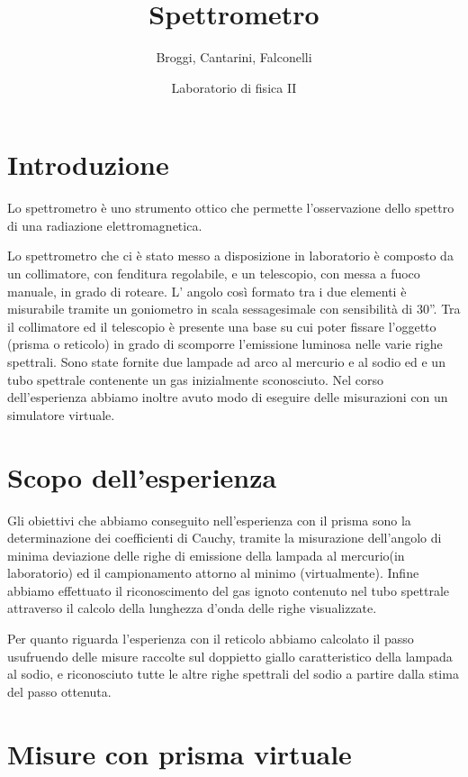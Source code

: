 \documentclass[a4paper]{article}
\title{Spettrometro}
\author{Broggi, Cantarini, Falconelli}
\date{Laboratorio di fisica II}
\theoremstyle{definition}
\begin{document}
\maketitle

\section{Introduzione}

Lo spettrometro è uno strumento ottico che permette l’osservazione dello spettro di una radiazione elettromagnetica.

Lo spettrometro che ci è stato messo a disposizione in laboratorio è composto da un collimatore, con fenditura regolabile, e un telescopio, con messa a fuoco manuale, in grado di roteare. L' angolo così formato tra i due elementi è misurabile tramite un goniometro in scala sessagesimale con sensibilità di 30”. Tra il collimatore ed il telescopio è presente una base su cui poter fissare l’oggetto (prisma o reticolo) in grado di scomporre l’emissione luminosa nelle varie righe spettrali. Sono state fornite due lampade ad arco al mercurio e al sodio ed e un tubo spettrale contenente un gas inizialmente sconosciuto.
Nel corso dell’esperienza abbiamo inoltre avuto modo di eseguire delle misurazioni con un simulatore virtuale.

\section{Scopo dell'esperienza}

Gli obiettivi che abbiamo conseguito nell’esperienza con il prisma sono la determinazione dei coefficienti di Cauchy, tramite la misurazione dell’angolo di minima deviazione delle righe di emissione della lampada al mercurio(in laboratorio) ed il campionamento attorno al minimo (virtualmente). Infine abbiamo effettuato il riconoscimento del gas ignoto contenuto nel tubo spettrale attraverso il calcolo della lunghezza d’onda delle righe visualizzate.

Per quanto riguarda l’esperienza con il reticolo abbiamo calcolato il passo usufruendo delle misure raccolte sul doppietto giallo caratteristico della lampada al sodio, e riconosciuto tutte le altre righe spettrali del sodio a partire dalla stima del passo ottenuta. 

\pagebreak

\section{Misure con prisma virtuale}
\end{document}
